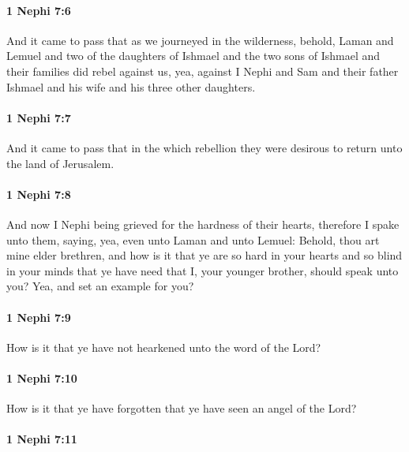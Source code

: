 		\paragraph{1 Nephi 7:6} %
			\label{1NEPHI-7-6}

			And it came to pass that as we journeyed in the wilderness,
			behold, Laman and Lemuel and two of the daughters of Ishmael
			and the two sons of Ishmael and their families did rebel against us,
			yea, against I Nephi and Sam
			and their father Ishmael and his wife and his three other daughters.

		\paragraph{1 Nephi 7:7} %
			\label{1NEPHI-7-7}

			And it came to pass that in the which rebellion
			they were desirous to return unto the land of Jerusalem.

		\paragraph{1 Nephi 7:8} %
			\label{1NEPHI-7-8}

			And now I Nephi being grieved for the hardness of their hearts,
			therefore I spake unto them, saying,
			yea, even unto Laman and unto Lemuel:
			Behold, thou art mine elder brethren,
			and how is it that ye are so hard in your hearts and so blind in your minds
			that ye have need that I, your younger brother, should speak unto you?
			Yea, and set an example for you?

		\paragraph{1 Nephi 7:9} %
			\label{1NEPHI-7-9}

			How is it that ye have not hearkened unto the word of the Lord?

		\paragraph{1 Nephi 7:10} %
			\label{1NEPHI-7-10}

			How is it that ye have forgotten that ye have seen an angel of the Lord?

		\paragraph{1 Nephi 7:11} %
			\label{1NEPHI-7-11}

